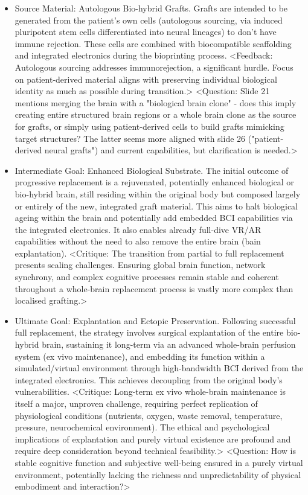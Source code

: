 \documentclass[10pt]{article}
\begin{document}
\begin{sloppypar}
\begin{itemize}
    \item Source Material: Autologous Bio-hybrid Grafts. Grafts are intended to be generated from the patient's own cells (autologous sourcing, via induced pluripotent stem cells differentiated into neural lineages) to don't have immune rejection. These cells are combined with biocompatible scaffolding and integrated electronics during the bioprinting process. <Feedback: Autologous sourcing addresses immunorejection, a significant hurdle. Focus on patient-derived material aligns with preserving individual biological identity as much as possible during transition.> <Question: Slide 21 mentions merging the brain with a "biological brain clone" - does this imply creating entire structured brain regions or a whole brain clone as the source for grafts, or simply using patient-derived cells to build grafts mimicking target structures? The latter seems more aligned with slide 26 ("patient-derived neural grafts") and current capabilities, but clarification is needed.>

    \item Intermediate Goal: Enhanced Biological Substrate. The initial outcome of progressive replacement is a rejuvenated, potentially enhanced biological or bio-hybrid brain, still residing within the original body but composed largely or entirely of the new, integrated graft material. This aims to halt biological ageing within the brain and potentially add embedded BCI capabilities via the integrated electronics. It also enables already full-dive VR/AR capabilities without the need to also remove the entire brain (bain explantation). <Critique: The transition from partial to full replacement presents scaling challenges. Ensuring global brain function, network synchrony, and complex cognitive processes remain stable and coherent throughout a whole-brain replacement process is vastly more complex than localised grafting.>

    \item Ultimate Goal: Explantation and Ectopic Preservation. Following successful full replacement, the strategy involves surgical explantation of the entire bio-hybrid brain, sustaining it long-term via an advanced whole-brain perfusion system (ex vivo maintenance), and embedding its function within a simulated/virtual environment through high-bandwidth BCI derived from the integrated electronics. This achieves decoupling from the original body's vulnerabilities. <Critique: Long-term ex vivo whole-brain maintenance is itself a major, unproven challenge, requiring perfect replication of physiological conditions (nutrients, oxygen, waste removal, temperature, pressure, neurochemical environment). The ethical and psychological implications of explantation and purely virtual existence are profound and require deep consideration beyond technical feasibility.> <Question: How is stable cognitive function and subjective well-being ensured in a purely virtual environment, potentially lacking the richness and unpredictability of physical embodiment and interaction?>


\end{itemize}
\end{sloppypar}
\end{document}

